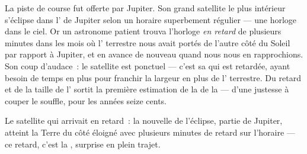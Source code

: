 \begin{example}\label{ex:g8:speed-of-light:romer}
La piste de course fut offerte par Jupiter. Son grand satellite le
plus intérieur s'éclipse dans l' de Jupiter selon un horaire
superbement régulier --- une horloge dans le ciel. Or un astronome
patient trouva l'horloge \emph{en retard} de plusieurs minutes dans
les mois où l' terrestre nous avait portés de l'autre côté du
Soleil par rapport à Jupiter, et en avance de nouveau quand nous nous
en rapprochions. Son coup d'audace~: le satellite est ponctuel ---
c'est sa \emph{} qui est retardée, ayant besoin de temps en
plus pour franchir la largeur en plus de l' terrestre. Du retard
et de la taille de l' sortit la première estimation de la
 de la  --- d'une justesse à couper le souffle, pour les
années seize cents.
\end{example}

\begin{omfigure}

{\small Le satellite qui arrivait en retard~: la nouvelle de
l'éclipse, partie de Jupiter, atteint la Terre du côté éloigné avec
plusieurs minutes de retard sur l'horaire --- ce retard, c'est la
, surprise en plein trajet.}
\end{omfigure}

